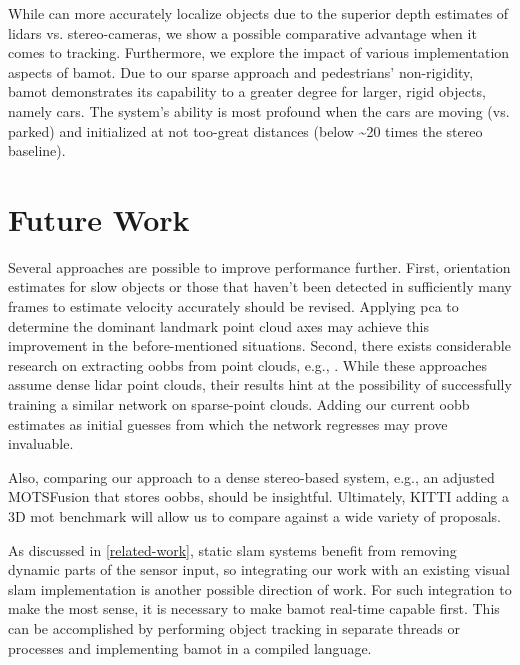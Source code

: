 \documentclass[headsepline, hidelinks, footsepline, footinclude=false, oneside, fontsize=11pt, paper=a4, listof=totoc, bibliography=totoc]{scrbook}
\begin{document}
While \cite{wengBaseline3DMultiObject2019} can more accurately localize objects due to the superior depth estimates of \glspl{lidar} vs. stereo-cameras, we show a possible comparative advantage when it comes to tracking.
Furthermore, we explore the impact of various implementation aspects of \gls{bamot}.
Due to our sparse approach and pedestrians' non-rigidity, \gls{bamot} demonstrates its capability to a greater degree for larger, rigid objects, namely cars.
The system's ability is most profound when the cars are moving (vs. parked) and initialized at not too-great distances (below \textasciitilde{}20 times the stereo baseline).

\section{Future Work}
\label{sec:org16677d7}
   Several approaches are possible to improve performance further.
First, orientation estimates for slow objects or those that haven't been detected in sufficiently many frames to estimate velocity accurately should be revised. 
Applying \gls{pca} to determine the dominant landmark point cloud axes may achieve this improvement in the before-mentioned situations. Second, there exists considerable research on extracting \glspl{oobb} from point clouds, e.g., \cite{qiFrustumPointNets3D2018,shiPointRCNN3DObject2019a}.
While these approaches assume dense \gls{lidar} point clouds, their results hint at the possibility of successfully training a similar network on sparse-point clouds. 
Adding our current \gls{oobb} estimates as initial guesses from which the network regresses may prove invaluable.

Also, comparing our approach to a dense stereo-based system, e.g., an adjusted MOTSFusion \cite{luitenTrackReconstructReconstruct2020} that stores \glspl{oobb}, should be insightful.
Ultimately,  KITTI adding a 3D \gls{mot} benchmark will allow us to compare against a wide variety of proposals. 

As discussed in \cref{related-work}, static \gls{slam} systems benefit from removing dynamic parts of the sensor input, so integrating our work with an existing visual \gls{slam} implementation is another possible direction of work.
For such integration to make the most sense, it is necessary to make \gls{bamot} real-time capable first.
This can be accomplished by performing object tracking in separate threads or processes and implementing \gls{bamot} in a compiled language.
\end{document}
